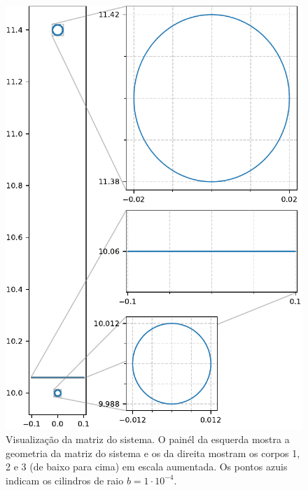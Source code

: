 \documentclass{aleph-revista}
\begin{document}
\begin{figure}[!h]
  \centering
  \includegraphics[width=\textwidth]{figures/matrix_plot.pdf}
  \caption{Visualização da matriz do sistema. O painél da esquerda mostra a geometria da matriz do sistema e os da direita mostram os corpos 1, 2 e 3 (de baixo para cima) em escala aumentada. Os pontos azuis indicam os cilindros de raio $b=1\cdot 10^{-4}$.}
  \label{fig:matrix}
\end{figure}

\newpage
\end{document}
